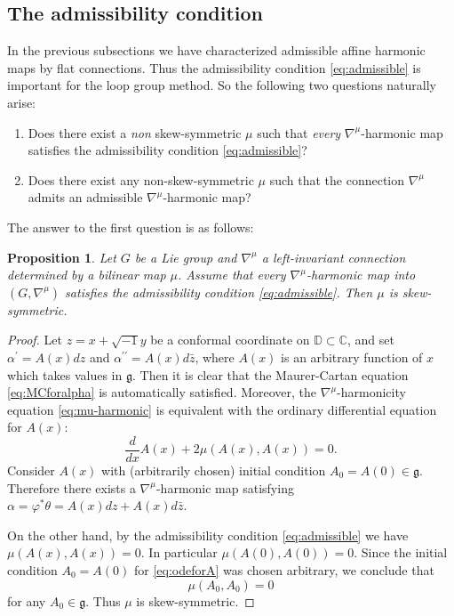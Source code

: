 \documentclass[12pt]{amsart}
\newtheorem{Proposition}[Theorem]{Proposition}
\theoremstyle{definition}
\theoremstyle{remark}
\numberwithin{equation}{section}
\begin{document}
\subsection{The admissibility condition}
\label{subsc:admissibility}
 In the previous subsections we have characterized admissible affine harmonic maps 
 by flat connections. Thus the admissibility condition \eqref{eq:admissible}
 is important for the loop group method. So the following 
 two questions naturally arise:
 \begin{enumerate}
\item Does there exist a \textit{non} skew-symmetric $\mu$ such that 
 \textit{every} ${\nabla^{\mu}}$-harmonic map satisfies the admissibility condition 
 \eqref{eq:admissible}?
\item Does there exist any non-skew-symmetric $\mu$ such that 
 the connection ${\nabla^{\mu}}$ admits an admissible ${\nabla^{\mu}}$-harmonic map?
 \end{enumerate}
 The answer to the first question is as follows:
\begin{Proposition}\label{pro:admissibleandmu}
 Let $G$ be a Lie group and ${\nabla^{\mu}}$ a left-invariant connection
 determined by a bilinear map $\mu$. 
 Assume that every ${\nabla^{\mu}}$-harmonic map into $(G, {\nabla^{\mu}})$
 satisfies the admissibility 
 condition \eqref{eq:admissible}. 
 Then $\mu$ is skew-symmetric.
\end{Proposition}
\begin{proof}
 Let $z = x+ \sqrt{-1}y$
 be a conformal coordinate on ${\mathbb D}\subset {\mathbb C}$, and set 
 $\alpha^{\prime} = A(x) dz$
 and $\alpha^{\prime\prime} = A(x) d\bar z$, where $A (x)$ is 
 an arbitrary function of $x$ which takes values in $\mathfrak g$. Then 
 it is clear that the Maurer-Cartan equation \eqref{eq:MCforalpha}
 is automatically satisfied. Moreover, the 
 ${\nabla^{\mu}}$-harmonicity equation \eqref{eq:mu-harmonic} is equivalent with 
 the ordinary differential equation for $A(x)$:
 \begin{equation}\label{eq:odeforA}
 \frac{d}{d x} A(x) + 2 \mu (A(x), A(x))=0.
 \end{equation}
 Consider $A(x)$ 
 with (arbitrarily chosen) initial condition $A_0 = A(0) \in \mathfrak g$.
 Therefore there exists a ${\nabla^{\mu}}$-harmonic map satisfying $\alpha = \varphi^* \theta 
 = A(x) dz + A(x) d \bar z$. 
 
 On the other hand, by the admissibility condition \eqref{eq:admissible} we have 
 $\mu (A(x), A(x))=0$.
 In particular $\mu (A(0), A(0))=0$. Since the initial condition $A_0 =A(0)$
 for \eqref{eq:odeforA} was chosen arbitrary, we conclude that 
\begin{equation*}
 \mu (A_0, A_0)=0
\end{equation*}
 for any $A_0 \in \mathfrak g$. Thus $\mu$ is skew-symmetric.
\end{proof}
\end{document}
